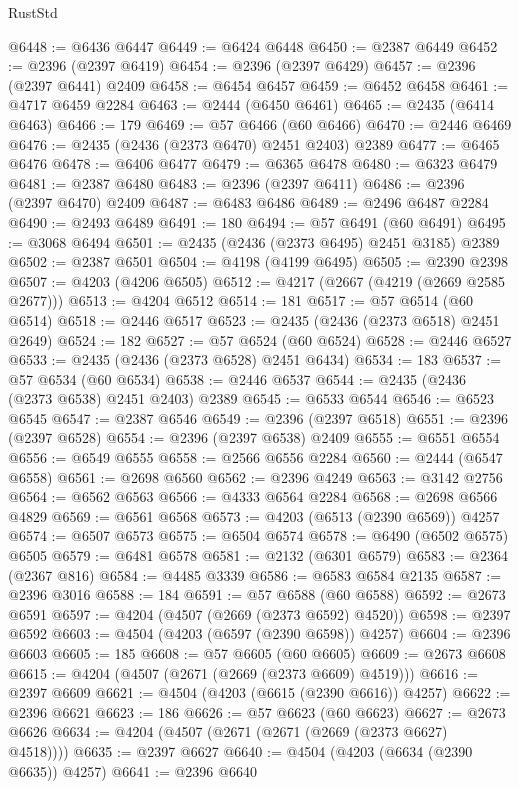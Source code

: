 \begin{lexlean}{RustStd}
\begin{coremodule}
@6448 := @6436 @6447
@6449 := @6424 @6448
@6450 := @2387 @6449
@6452 := @2396 (@2397 @6419)
@6454 := @2396 (@2397 @6429)
@6457 := @2396 (@2397 @6441) @2409
@6458 := @6454 @6457
@6459 := @6452 @6458
@6461 := @4717 @6459 @2284
@6463 := @2444 (@6450 @6461)
@6465 := @2435 (@6414 @6463)
@6466 := 179
@6469 := @57 @6466 (@60 @6466)
@6470 := @2446 @6469
@6476 := @2435 (@2436 (@2373 @6470) @2451 @2403) @2389
@6477 := @6465 @6476
@6478 := @6406 @6477
@6479 := @6365 @6478
@6480 := @6323 @6479
@6481 := @2387 @6480
@6483 := @2396 (@2397 @6411)
@6486 := @2396 (@2397 @6470) @2409
@6487 := @6483 @6486
@6489 := @2496 @6487 @2284
@6490 := @2493 @6489
@6491 := 180
@6494 := @57 @6491 (@60 @6491)
@6495 := @3068 @6494
@6501 := @2435 (@2436 (@2373 @6495) @2451 @3185) @2389
@6502 := @2387 @6501
@6504 := @4198 (@4199 @6495)
@6505 := @2390 @2398
@6507 := @4203 (@4206 @6505)
@6512 := @4217 (@2667 (@4219 (@2669 @2585 @2677)))
@6513 := @4204 @6512
@6514 := 181
@6517 := @57 @6514 (@60 @6514)
@6518 := @2446 @6517
@6523 := @2435 (@2436 (@2373 @6518) @2451 @2649)
@6524 := 182
@6527 := @57 @6524 (@60 @6524)
@6528 := @2446 @6527
@6533 := @2435 (@2436 (@2373 @6528) @2451 @6434)
@6534 := 183
@6537 := @57 @6534 (@60 @6534)
@6538 := @2446 @6537
@6544 := @2435 (@2436 (@2373 @6538) @2451 @2403) @2389
@6545 := @6533 @6544
@6546 := @6523 @6545
@6547 := @2387 @6546
@6549 := @2396 (@2397 @6518)
@6551 := @2396 (@2397 @6528)
@6554 := @2396 (@2397 @6538) @2409
@6555 := @6551 @6554
@6556 := @6549 @6555
@6558 := @2566 @6556 @2284
@6560 := @2444 (@6547 @6558)
@6561 := @2698 @6560
@6562 := @2396 @4249
@6563 := @3142 @2756
@6564 := @6562 @6563
@6566 := @4333 @6564 @2284
@6568 := @2698 @6566 @4829
@6569 := @6561 @6568
@6573 := @4203 (@6513 (@2390 @6569)) @4257
@6574 := @6507 @6573
@6575 := @6504 @6574
@6578 := @6490 (@6502 @6575) @6505
@6579 := @6481 @6578
@6581 := @2132 (@6301 @6579)
@6583 := @2364 (@2367 @816)
@6584 := @4485 @3339
@6586 := @6583 @6584 @2135
@6587 := @2396 @3016
@6588 := 184
@6591 := @57 @6588 (@60 @6588)
@6592 := @2673 @6591
@6597 := @4204 (@4507 (@2669 (@2373 @6592) @4520))
@6598 := @2397 @6592
@6603 := @4504 (@4203 (@6597 (@2390 @6598)) @4257)
@6604 := @2396 @6603
@6605 := 185
@6608 := @57 @6605 (@60 @6605)
@6609 := @2673 @6608
@6615 := @4204 (@4507 (@2671 (@2669 (@2373 @6609) @4519)))
@6616 := @2397 @6609
@6621 := @4504 (@4203 (@6615 (@2390 @6616)) @4257)
@6622 := @2396 @6621
@6623 := 186
@6626 := @57 @6623 (@60 @6623)
@6627 := @2673 @6626
@6634 := @4204 (@4507 (@2671 (@2671 (@2669 (@2373 @6627) @4518))))
@6635 := @2397 @6627
@6640 := @4504 (@4203 (@6634 (@2390 @6635)) @4257)
@6641 := @2396 @6640

\end{coremodule}
\end{lexlean}
